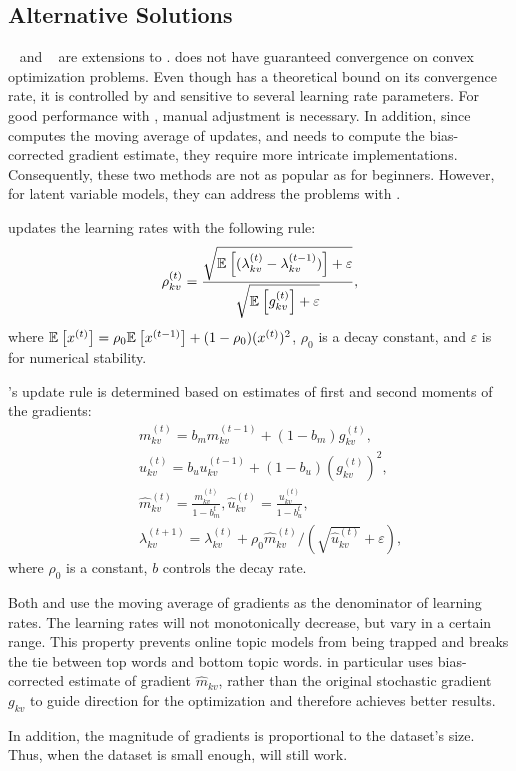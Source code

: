 \subsection{Alternative Solutions}



~\cite{zeiler2012adadelta} and ~\cite{kingma2014adam}
are extensions to .
 does not have guaranteed convergence on convex optimization
problems. Even though  has a theoretical bound on its convergence
rate, it is controlled by and sensitive to several learning rate parameters.
For good performance with , manual adjustment is necessary.
In addition, since  computes the moving average of updates, and
 needs to compute the bias-corrected gradient estimate, they require
more intricate implementations. Consequently, these two methods are not as popular as  for beginners. However, for  latent variable models, they can address the problems with .



 updates the learning rates with the
following rule:
\begin{equation}
\rho _{kv}^{(t)} = \frac{{\sqrt {\mathbb{E}_{}\left[ (\lambda _{kv}^{(t)} - \lambda _{kv}^{(t - 1)}) \right] + \varepsilon } }}{{\sqrt {\mathbb{E}_{}\left[ g_{kv}^{(t)} \right] + \varepsilon } }},
\end{equation}
where $\mathbb{E}_{}\left[ x^{(t)} \right]= {\rho _0}\mathbb{E}_{}\left[ x^{(t - 1)} \right] + (1 - {\rho _0}){({x^{(t)}})^2}$, $\rho_0$ is a decay constant, and  $\varepsilon$ is for numerical stability.

's update rule is determined based on estimates of first and
second moments of the gradients:
\begin{eqnarray}
&&m_{kv}^{(t)} = {b_m}m_{kv}^{(t - 1)} + (1 - {b_m})g_{kv}^{(t)}, \nonumber\\
&&u_{kv}^{(t)} = {b_u}u_{kv}^{(t - 1)} + (1 - {b_u}){(g_{kv}^{(t)})^2}, \nonumber\\
&&\hat m_{kv}^{(t)} = \frac{{m_{kv}^{(t)}}}{{1 - b_m^t}}, \hat u_{kv}^{(t)} = \frac{{u_{kv}^{(t)}}}{{1 - b_u^t}}, \nonumber\\
&&\lambda _{kv}^{(t + 1)} = \lambda _{kv}^{(t)} + {\rho _0}\hat m_{kv}^{(t)}/(\sqrt {\hat u_{kv}^{(t)}}  + \varepsilon )
\label{eq: adam_update_rule},
\end{eqnarray}
where $\rho_0$ is a constant, $b$ controls the decay rate.



Both  and  use the moving average of gradients as the
denominator of learning rates. The learning rates will not monotonically
decrease, but vary in a certain range. This property prevents online topic
models from being trapped and
breaks the tie between top words and bottom topic words.
 in particular uses bias-corrected estimate of gradient $\hat
m_{kv}$, rather than the original stochastic gradient $g_{kv}$ to guide
direction for the optimization and therefore achieves better results.

In addition, the magnitude of gradients is proportional to the
dataset's size. Thus, when the dataset is small enough, 
will still work.
